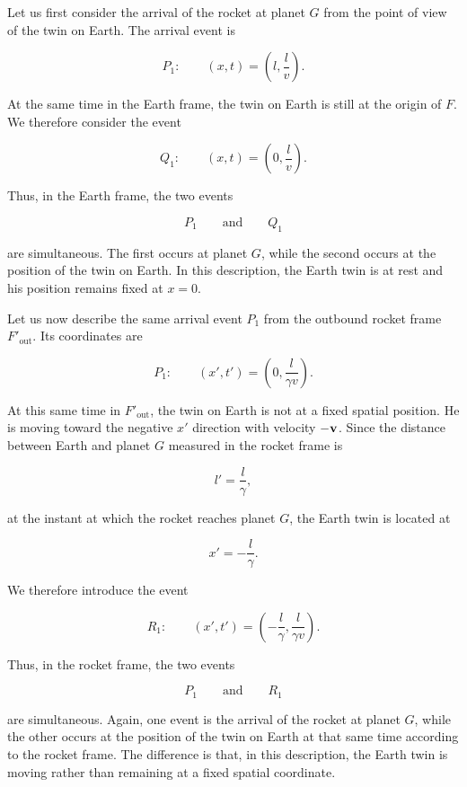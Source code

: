 \documentclass[12pt]{article}
\begin{document}
Let us first consider the arrival of the rocket at planet $G$ from the point of view
of the twin on Earth. The arrival event is

\[
  P_1:
  \qquad
  (x,t)
  =
  \left(
    l,\frac{l}{v}
  \right).
\]

At the same time in the Earth frame, the twin on Earth is still at the origin of $F$.
We therefore consider the event

\[
  Q_1:
  \qquad
  (x,t)
  =
  \left(
    0,\frac{l}{v}
  \right).
\]

Thus, in the Earth frame, the two events

\[
  P_1
  \qquad\text{and}\qquad
  Q_1
\]

are simultaneous. The first occurs at planet $G$, while the second occurs at the
position of the twin on Earth. In this description, the Earth twin is at rest and his
position remains fixed at $x=0$. \par

Let us now describe the same arrival event $P_1$ from the outbound rocket frame
$F'_{\mathrm{out}}$. Its coordinates are

\[
  P_1:
  \qquad
  (x',t')
  =
  \left(
    0,\frac{l}{\gamma v}
  \right).
\]

At this same time in $F'_{\mathrm{out}}$, the twin on Earth is not at a fixed spatial
position. He is moving toward the negative $x'$ direction with velocity $-\vb{v}$.
Since the distance between Earth and planet $G$ measured in the rocket frame is

\[
  l'=\frac{l}{\gamma},
\]

at the instant at which the rocket reaches planet $G$, the Earth twin is located at

\[
  x'=-\frac{l}{\gamma}.
\]

We therefore introduce the event

\[
  R_1:
  \qquad
  (x',t')
  =
  \left(
    -\frac{l}{\gamma},
    \frac{l}{\gamma v}
  \right).
\]

Thus, in the rocket frame, the two events

\[
  P_1
  \qquad\text{and}\qquad
  R_1
\]

are simultaneous. Again, one event is the arrival of the rocket at planet $G$, while
the other occurs at the position of the twin on Earth at that same time according to
the rocket frame. The difference is that, in this description, the Earth twin is
moving rather than remaining at a fixed spatial coordinate. \par
\end{document}
